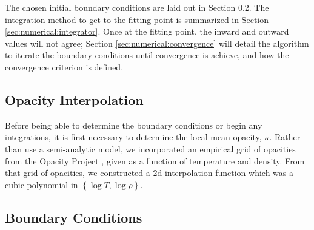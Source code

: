 The chosen initial boundary conditions are laid out in Section \ref{sec:numerical:boundary}.  The integration method to get to the fitting point is summarized in Section \ref{sec:numerical:integrator}.  Once at the fitting point, the inward and outward values will not agree; Section \ref{sec:numerical:convergence} will detail the algorithm to iterate the boundary conditions until convergence is achieve, and how the convergence criterion is defined.

\subsection{Opacity Interpolation}
\label{sec:numerical:opacity}
Before being able to determine the boundary conditions or begin any integrations, it is first necessary to determine the local mean opacity, $\kappa$.  Rather than use a semi-analytic model, we incorporated an empirical grid of opacities from the Opacity Project \citep{OpacityProject}, given as a function of temperature and density.  From that grid of opacities, we constructed a 2d-interpolation function which was a cubic polynomial in $\left\{\log T, \log \rho \right\}$.

\subsection{Boundary Conditions}
\label{sec:numerical:boundary}

